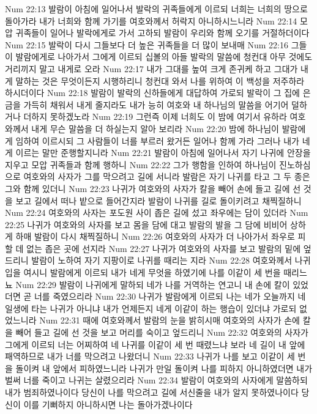 Num 22:13  발람이 아침에 일어나서 발락의 귀족들에게 이르되 너희는 너희의 땅으로 돌아가라 내가 너희와 함께 가기를 여호와께서 허락지 아니하시느니라
Num 22:14  모압 귀족들이 일어나 발락에게로 가서 고하되 발람이 우리와 함께 오기를 거절하더이다
Num 22:15  발락이 다시 그들보다 더 높은 귀족들을 더 많이 보내매
Num 22:16  그들이 발람에게로 나아가서 그에게 이르되 십볼의 아들 발락의 말씀에 청컨대 아무 것에도 거리끼지 말고 내게로 오라
Num 22:17  내가 그대를 높여 크게 존귀케 하고 그대가 내게 말하는 것은 무엇이든지 시행하리니 청컨대 와서 나를 위하여 이 백성을 저주하라 하시더이다
Num 22:18  발람이 발락의 신하들에게 대답하여 가로되 발락이 그 집에 은 금을 가득히 채워서 내게 줄지라도 내가 능히 여호와 내 하나님의 말씀을 어기어 덜하거나 더하지 못하겠노라
Num 22:19  그런즉 이제 너희도 이 밤에 여기서 유하라 여호와께서 내게 무슨 말씀을 더 하실는지 알아 보리라
Num 22:20  밤에 하나님이 발람에게 임하여 이르시되 그 사람들이 너를 부르러 왔거든 일어나 함께 가라 그러나 내가 네게 이르는 말만 준행할지니라
Num 22:21  발람이 아침에 일어나서 자기 나귀에 안장을 지우고 모압 귀족들과 함께 행하니
Num 22:22  그가 행함을 인하여 하나님이 진노하심으로 여호와의 사자가 그를 막으려고 길에 서니라 발람은 자기 나귀를 타고 그 두 종은 그와 함께 있더니
Num 22:23  나귀가 여호와의 사자가 칼을 빼어 손에 들고 길에 선 것을 보고 길에서 떠나 밭으로 들어간지라 발람이 나귀를 길로 돌이키려고 채찍질하니
Num 22:24  여호와의 사자는 포도원 사이 좁은 길에 섰고 좌우에는 담이 있더라
Num 22:25  나귀가 여호와의 사자를 보고 몸을 담에 대고 발람의 발을 그 담에 비비어 상하게 하매 발람이 다시 채찍질하니
Num 22:26  여호와의 사자가 더 나아가서 좌우로 피할 데 없는 좁은 곳에 선지라
Num 22:27  나귀가 여호와의 사자를 보고 발람의 밑에 엎드리니 발람이 노하여 자기 지팡이로 나귀를 때리는 지라
Num 22:28  여호와께서 나귀 입을 여시니 발람에게 이르되 내가 네게 무엇을 하였기에 나를 이같이 세 번을 때리느뇨
Num 22:29  발람이 나귀에게 말하되 네가 나를 거역하는 연고니 내 손에 칼이 있었더면 곧 너를 죽였으리라
Num 22:30  나귀가 발람에게 이르되 나는 네가 오늘까지 네 일생에 타는 나귀가 아니냐 내가 언제든지 네게 이같이 하는 행습이 있더냐 가로되 없었느니라
Num 22:31  때에 여호와께서 발람의 눈을 밝히시매 여호와의 사자가 손에 칼을 빼어 들고 길에 선 것을 보고 머리를 숙이고 엎드리니
Num 22:32  여호와의 사자가 그에게 이르되 너는 어찌하여 네 나귀를 이같이 세 번 때렸느냐 보라 네 길이 내 앞에 패역하므로 내가 너를 막으려고 나왔더니
Num 22:33  나귀가 나를 보고 이같이 세 번을 돌이켜 내 앞에서 피하였느니라 나귀가 만일 돌이켜 나를 피하지 아니하였더면 내가 벌써 너를 죽이고 나귀는 살렸으리라
Num 22:34  발람이 여호와의 사자에게 말씀하되 내가 범죄하였나이다 당신이 나를 막으려고 길에 서신줄을 내가 알지 못하였나이다 당신이 이를 기뻐하지 아니하시면 나는 돌아가겠나이다
